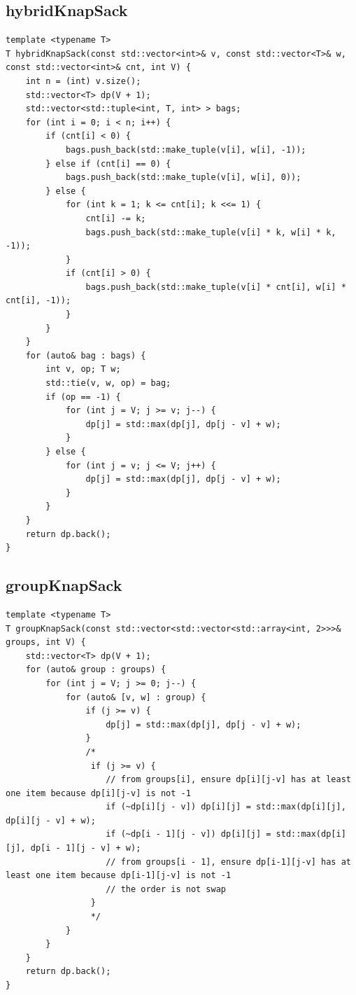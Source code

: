 \documentclass[twoside]{article}
\begin{document}
\subsection{hybridKnapSack}
\begin{lstlisting}
template <typename T>
T hybridKnapSack(const std::vector<int>& v, const std::vector<T>& w, const std::vector<int>& cnt, int V) {
    int n = (int) v.size();
    std::vector<T> dp(V + 1);
    std::vector<std::tuple<int, T, int> > bags;
    for (int i = 0; i < n; i++) {
        if (cnt[i] < 0) {
            bags.push_back(std::make_tuple(v[i], w[i], -1));
        } else if (cnt[i] == 0) {
            bags.push_back(std::make_tuple(v[i], w[i], 0));
        } else {
            for (int k = 1; k <= cnt[i]; k <<= 1) {
                cnt[i] -= k;
                bags.push_back(std::make_tuple(v[i] * k, w[i] * k, -1));
            }
            if (cnt[i] > 0) {
                bags.push_back(std::make_tuple(v[i] * cnt[i], w[i] * cnt[i], -1));
            }
        }
    }
    for (auto& bag : bags) {
        int v, op; T w;
        std::tie(v, w, op) = bag;
        if (op == -1) {
            for (int j = V; j >= v; j--) {
                dp[j] = std::max(dp[j], dp[j - v] + w);
            }
        } else {
            for (int j = v; j <= V; j++) {
                dp[j] = std::max(dp[j], dp[j - v] + w);
            }
        }
    }
    return dp.back();
}\end{lstlisting}
\subsection{groupKnapSack}
\begin{lstlisting}
template <typename T>
T groupKnapSack(const std::vector<std::vector<std::array<int, 2>>>& groups, int V) {
    std::vector<T> dp(V + 1);
    for (auto& group : groups) {
        for (int j = V; j >= 0; j--) {
            for (auto& [v, w] : group) {
                if (j >= v) {
                    dp[j] = std::max(dp[j], dp[j - v] + w);
                }
                /*
                 if (j >= v) {
                    // from groups[i], ensure dp[i][j-v] has at least one item because dp[i][j-v] is not -1
                    if (~dp[i][j - v]) dp[i][j] = std::max(dp[i][j], dp[i][j - v] + w);
                    if (~dp[i - 1][j - v]) dp[i][j] = std::max(dp[i][j], dp[i - 1][j - v] + w);
                    // from groups[i - 1], ensure dp[i-1][j-v] has at least one item because dp[i-1][j-v] is not -1
                    // the order is not swap
                 }
                 */
            }
        }
    }
    return dp.back();
}
\end{lstlisting}
\end{document}
